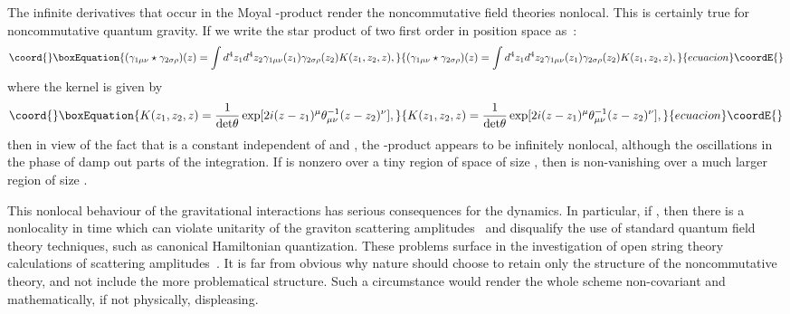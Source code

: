 \documentclass[a4paper,10pt]{article}
\begin{document}
The infinite derivatives that occur in the Moyal \myHighlight{$\star$}\coordHE{}-product render the
noncommutative field theories nonlocal. This is certainly true for
noncommutative quantum gravity. If we write the star product of two first
order \myHighlight{$\gamma_{\mu\nu}$}\coordHE{} in position space as~\cite{Minwalla}:
\begin{equation}\coord{}\boxEquation{
(\gamma_{1\mu\nu}\star\gamma_{2\sigma\rho})(z)=
\int d^4z_1d^4z_2\gamma_{1\mu\nu}(z_1)\gamma_{2\sigma\rho}(z_2)K(z_1,z_2,z),
}{
(\gamma_{1\mu\nu}\star\gamma_{2\sigma\rho})(z)=
\int d^4z_1d^4z_2\gamma_{1\mu\nu}(z_1)\gamma_{2\sigma\rho}(z_2)K(z_1,z_2,z),
}{ecuacion}\coordE{}\end{equation}
where the kernel \coordHE{} is given by
\begin{equation}\coord{}\boxEquation{
K(z_1,z_2,z)=\frac{1}{{\rm
det\theta}}\exp[2i(z-z_1)^\mu\theta_{\mu\nu}^{-1}(z-z_2)^\nu],
}{
K(z_1,z_2,z)=\frac{1}{{\rm
det\theta}}\exp[2i(z-z_1)^\mu\theta_{\mu\nu}^{-1}(z-z_2)^\nu],
}{ecuacion}\coordE{}\end{equation}
then in view of the fact that \coordHE{} is a constant independent of
\coordHE{} and \coordHE{}, the \myHighlight{$\star$}\coordHE{}-product appears to be infinitely
nonlocal, although the oscillations in the phase of \coordHE{} damp out parts of
the integration. If \myHighlight{$\gamma_{\mu\nu}$}\coordHE{} is nonzero over a tiny region of
space of size \myHighlight{$\Delta \ll \sqrt{\theta}$}\coordHE{}, then \myHighlight{$\gamma\star\gamma$}\coordHE{} is
non-vanishing over a much larger region of size \myHighlight{$\theta/\Delta$}\coordHE{}.

This nonlocal behaviour of the gravitational interactions has serious
consequences for the dynamics. In particular, if \coordHE{}, then
there is a nonlocality in time which can violate unitarity of the graviton
scattering amplitudes~\cite{Gomis} and disqualify the use of standard
quantum field theory techniques, such as canonical Hamiltonian
quantization. These problems surface in the investigation of open
string theory calculations of scattering
amplitudes~\cite{Seiberg,Seiberg2}. It is far from obvious why nature
should choose to retain only the \coordHE{} structure of the
noncommutative theory, and not include the more problematical
\coordHE{} structure. Such a circumstance would render the whole
scheme non-covariant and mathematically, if not physically, displeasing.
\end{document}
